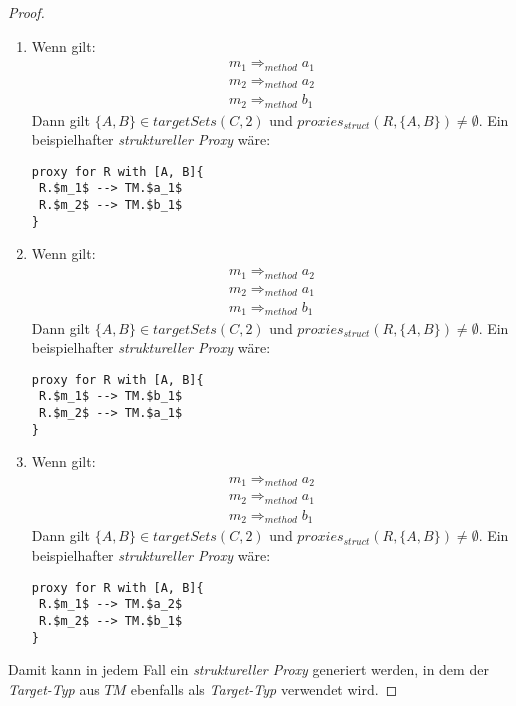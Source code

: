 \begin{proof}
\begin{enumerate}
\item 
Wenn gilt: 
\begin{gather*}
m_1 \Rightarrow_{method} a_1 \\
m_2 \Rightarrow_{method} a_2 \\
m_2 \Rightarrow_{method} b_1
\end{gather*}
Dann gilt $\{A, B\} \in \mathit{targetSets(C,2)}$ und $\mathit{proxies_{struct}(R,\{A, B\})} \neq \emptyset$.
Ein beispielhafter \emph{struktureller Proxy} wäre:
\begin{lstlisting}[mathescape, style=dsl]
proxy for R with [A, B]{
 R.$m_1$ --> TM.$a_1$
 R.$m_2$ --> TM.$b_1$
}
\end{lstlisting}
\item 
Wenn gilt: 
\begin{gather*}
m_1 \Rightarrow_{method} a_2 \\
m_2 \Rightarrow_{method} a_1 \\
m_1 \Rightarrow_{method} b_1
\end{gather*}
Dann gilt $\{A, B\} \in \mathit{targetSets(C,2)}$ und $\mathit{proxies_{struct}(R,\{A, B\})} \neq \emptyset$.
Ein beispielhafter \emph{struktureller Proxy} wäre:
\begin{lstlisting}[mathescape, style=dsl]
proxy for R with [A, B]{
 R.$m_1$ --> TM.$b_1$
 R.$m_2$ --> TM.$a_1$
}
\end{lstlisting}

\item 
Wenn gilt: 
\begin{gather*}
m_1 \Rightarrow_{method} a_2 \\
m_2 \Rightarrow_{method} a_1 \\
m_2 \Rightarrow_{method} b_1
\end{gather*}
Dann gilt $\{A, B\} \in \mathit{targetSets(C,2)}$ und $\mathit{proxies_{struct}(R,\{A, B\})} \neq \emptyset$.
Ein beispielhafter \emph{struktureller Proxy} wäre:
\begin{lstlisting}[mathescape, style=dsl]
proxy for R with [A, B]{
 R.$m_1$ --> TM.$a_2$
 R.$m_2$ --> TM.$b_1$
}
\end{lstlisting}
\end{enumerate}
Damit kann in jedem Fall ein \emph{struktureller Proxy} generiert werden, in dem der \emph{Target-Typ} aus $\mathit{TM}$ ebenfalls als \emph{Target-Typ} verwendet wird.

\end{proof}